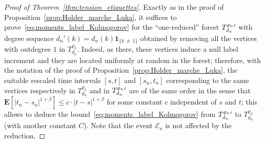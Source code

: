 \documentclass[AHL,Unicode,longabstracts,published]{cedram}
\newcommand{\ensembles}[1]{\mathbf{#1}}
\newcommand{\E}{\ensembles{E}}
\newcommand{\1}{\ensembles{1}}
\newcommand{\ind}[1]{\1_{\{#1\}}}
\renewcommand{\le}{\leqslant}
\newcommand{\clE}{\mathcal{E}}
\newcommand{\fn}{T_{d_n}^{\varrho_n}}
\begin{document}
\begin{proof}[Proof of Theorem~\ref{thm:tension_etiquettes}]
Exactly as in the proof of Proposition~\ref{prop:Holder_marche_Luka}, it suffices to prove~\eqref{eq:moments_label_Kolmogorov} for the ``one-reduced'' forest ${\fn}\vphantom{T}'$ with degree sequence $d_n'(k) = d_n(k) \ind{k\,\ne\,1}$ obtained by removing all the vertices with outdegree $1$ in $\fn$. Indeed, as there, these vertices induce a null label increment and they are located uniformly at random in the forest; therefore, with the notation of the proof of Proposition~\ref{prop:Holder_marche_Luka}, the suitable rescaled time intervals $[s,t]$ and $[s_{n}, t_{n}]$ corresponding to the same vertices respectively in $\fn$ and in ${\fn}\vphantom{T}'$ are of the same order in the sense that $\E[|t_{n}-s_{n}|^{1+\beta}] \le c\cdot |t-s|^{1+\beta}$ for some constant $c$ independent of $s$ and $t$; this allows to deduce the bound~\eqref{eq:moments_label_Kolmogorov} from ${\fn}\vphantom{T}'$ to $\fn$ (with another constant $C$). Note that the event $\clE_{n}$ is not affected by the reduction.


\end{proof}
\end{document}
